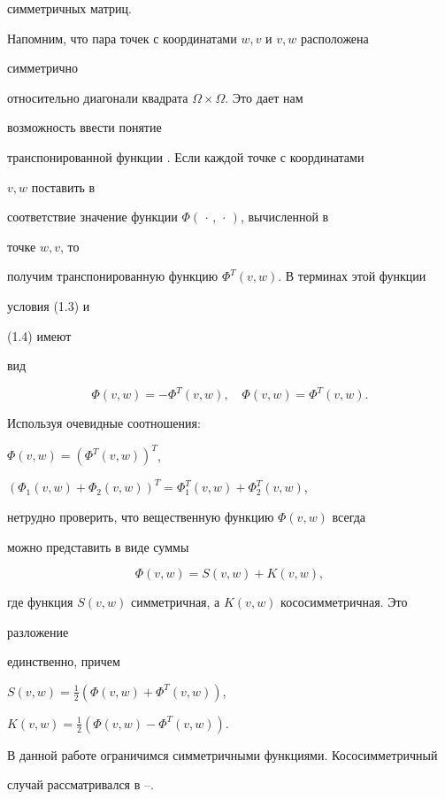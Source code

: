 симметричных матриц.





Напомним, что пара точек с координатами $w,v$ и $v,w$ расположена


симметрично


относительно диагонали квадрата $\Omega\times\Omega$. Это дает нам


возможность ввести понятие


транспонированной функции \cite{A3}. Если каждой точке с координатами


$v,w$ поставить в


соответствие значение функции $\Phi(\,\cdot\,,\,\cdot\,)$, вычисленной в


точке $w,v$, то


получим транспонированную функцию $\Phi^T(v,w)$. В терминах этой функции


условия (1.3) и


(1.4) имеют


вид


$$


\Phi(v,w)=-\Phi^T(v,w),\quad \Phi(v,w)=\Phi^T(v,w).


$$


Используя очевидные соотношения:


$\Phi(v,w)=(\Phi^T(v,w))^T$,


$(\Phi_1(v,w)+\Phi_2(v,w))^T=\Phi^T_1(v,w)+\Phi^T_2(v,w)$,


нетрудно проверить, что вещественную функцию $\Phi(v,w)$ всегда


можно представить в виде суммы


$$


\Phi(v,w)=S(v,w)+K(v,w),


$$


где функция $S(v,w)$ симметричная, а $K(v,w)$ кососимметричная. Это


разложение


единственно, причем


$S(v,w)=\frac{1}{2}(\Phi(v,w)+\Phi^T(v,w))$,


$K(v,w)=\frac{1}{2}(\Phi(v,w)-\Phi^T(v,w))$.





В данной работе ограничимся симметричными функциями. Кососимметричный


случай рассматривался в \cite{A1}--\cite{A3}.





